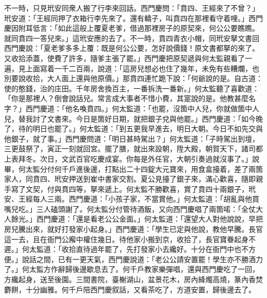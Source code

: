 不一時，只見玳安同衆人搬了行李來回話。西門慶問：「賁四、王經來了不曾？」玳安道：「王經同押了衣箱行李先來了。還有轎子，叫賁四在那裡看守着哩。」西門慶因附耳低言：「如此這般上覆夏老爹，借過那裡房子的原契來，何公公要瞧瞧。就同賁四一答兒來。」這玳安應的去了。不一時，賁四青衣小帽，同玳安拏文書回西門慶說：「夏老爹多多上覆：既是何公公要，怎好說價錢！原文書都拏的來了。又收拾添蓋，使費了許多，隨爹主張了罷。」西門慶把原契遞與何太監親看了一遍，見上面寫着一千二百兩，說道：「這房兒想必也住了幾年，未免有些糟爛，也別要說收拾，大人面上還與他原價。」那賁四連忙跪下說：「何爺說的是。自古道：使的憨錢，治的庄田。千年房舍換百主，一番拆洗一番新。」何太監聽了喜歡道：{}「你是那裡人？倒會說話兒。常言成大事者不惜小費，其寔說的是。他教甚麼名字？」西門慶道：「他名喚賁四。」何太監道：「也罷，沒箇中人兒，你就做箇中人兒，替我討了文書來。今日是箇好日期，就把銀子兌與他罷。」{}西門慶道：「如今晚了，待的明日也罷了。」何太監道：「到五更我早進去，明日大朝。今日不如先交與他銀子，就了事。」西門慶問道：「明日甚時駕出？」何太監道：「子時駕出到壇，三更鼓祭了，寅正一刻就回宮。擺了膳，就出來設朝，陞大殿，朝賀天下，諸司都上表拜冬。{}次日，文武百官吃慶成宴。你每是外任官，大朝引奏過就沒事了。」說畢，何太監分付何千戶進後邊，打點出二十四錠大元寶來，用食盒擡着，差了兩箇家人，同賁四、玳安押送到崔中書家交割。夏公見擡了銀子來，滿心歡喜，隨即親手寫了文契，付與賁四等，拏來遞上。何太監不勝歡喜，賞了賁四十兩銀子，玳安、王經每人三兩。西門慶道：「小孩子家，不當賞他。」何太監道：「胡亂與他買嘴兒吃。」三人磕頭謝了。何太監分付管待酒飯，又向西門慶唱了兩箇喏：「全仗大人餘光。」西門慶道：「還是看老公公金面。」何太監道：「還望大人對他說說，早把房兒騰出來，就好打發家小起身。」西門慶道：「學生已定與他說，教他早騰。長官這一去，且在衙門公廨中權住幾日。待他家小搬到京，收拾了，長官寶眷起身不遲。」何太監道：「收拾直待過年罷了，先打發家小去纔好。十分在衙門中也不方便。」說話之間，已有一更天氣，西門慶說道：「老公公請安置罷！學生亦不勝酒力了。」何太監方作辭歸後邊歇息去了。何千戶教家樂彈唱，還與西門慶吃了一回，方纔起身，送至後園。三間書院，臺榭湖山，盆景花木，房內絳燭高燒，篆內香焚麝餅，十分幽雅。何千戶陪西門慶叙話，又看茶吃了，方道安置，歸後邊去了。

